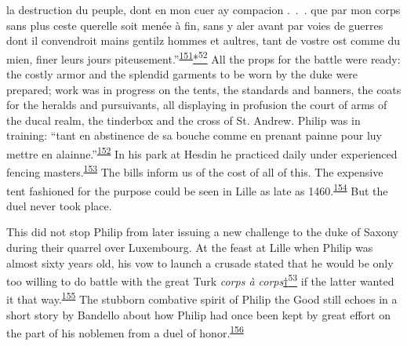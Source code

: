 la destruction du peuple, dont en mon cuer ay compacion .~.~. que par
mon corps sans plus ceste querelle soit menée à fin, sans y aler avant
par voies de guerres dont il convendroit mains gentilz hommes et
aultres, tant de vostre ost comme du mien, finer leurs jours
piteusement.''\textsuperscript{\protect\hypertarget{10_Chapter_Three__THE_HEROIC_DREAM.xhtmlux5cux23id_1633}{\protect\hyperlink{23_NOTES.xhtmlux5cux23id_1634}{151}}}\protect\hypertarget{10_Chapter_Three__THE_HEROIC_DREAM.xhtmlux5cux23id_2891}{\protect\hyperlink{23_NOTES.xhtmlux5cux23id_2892}{*\textsuperscript{52}}}
All the props for the battle were ready: the costly armor and the
splendid garments to be worn by the duke were prepared; work was in
progress on the tents, the standards and banners, the coats for the
heralds and pursuivants, all displaying in profusion the court of arms
of the ducal realm, the tinderbox and the cross of St. Andrew. Philip
was in training: ``tant en abstinence de sa bouche comme en prenant
painne pour luy mettre en
alainne.''\textsuperscript{\protect\hypertarget{10_Chapter_Three__THE_HEROIC_DREAM.xhtmlux5cux23id_1631}{\protect\hyperlink{23_NOTES.xhtmlux5cux23id_1632}{152}}}
In his park at Hesdin he practiced daily under experienced fencing
masters.\textsuperscript{\protect\hypertarget{10_Chapter_Three__THE_HEROIC_DREAM.xhtmlux5cux23id_1629}{\protect\hyperlink{23_NOTES.xhtmlux5cux23id_1630}{153}}}
The bills inform us of the cost of all of this. The expensive tent
fashioned for the purpose could be seen in Lille as late as
1460.\textsuperscript{\protect\hypertarget{10_Chapter_Three__THE_HEROIC_DREAM.xhtmlux5cux23id_1627}{\protect\hyperlink{23_NOTES.xhtmlux5cux23id_1628}{154}}}
But the duel never took place.

This did not stop Philip from later issuing a new challenge to the duke
of Saxony during their quarrel over Luxembourg. At the feast at Lille
when Philip was almost sixty years old, his vow to launch a crusade
stated that he would be only too willing to do battle with the great
Turk \emph{corps à
corps}\protect\hypertarget{10_Chapter_Three__THE_HEROIC_DREAM.xhtmlux5cux23id_2893}{\protect\hyperlink{23_NOTES.xhtmlux5cux23id_2894}{†\textsuperscript{53}}}
if the latter wanted it that
way.\textsuperscript{\protect\hypertarget{10_Chapter_Three__THE_HEROIC_DREAM.xhtmlux5cux23id_1626}{\protect\hyperlink{23_NOTES.xhtmlux5cux23page_410}{155}}}
The stubborn combative spirit of Philip the Good still echoes in a short
story by Bandello about how Philip had once been
\protect\hypertarget{10_Chapter_Three__THE_HEROIC_DREAM.xhtmlux5cux23page_109}{}{}kept
by great effort on the part of his noblemen from a duel of
honor.\textsuperscript{\protect\hypertarget{10_Chapter_Three__THE_HEROIC_DREAM.xhtmlux5cux23id_1624}{\protect\hyperlink{23_NOTES.xhtmlux5cux23id_1625}{156}}}

